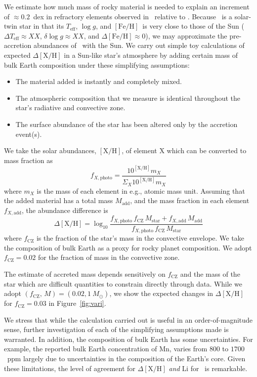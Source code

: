\documentclass[12pt,letterpaper,margin=1in]{article}
\newcommand*\elem[1]{\ensuremath{\mathrm{#1}}}
\newcommand*\elemH[1]{\ensuremath{[\mathrm{#1}/\elem{H}]}}
\newcommand*\logg{\ensuremath{\log{g}}}
\newcommand*{\feh}{\ensuremath{\elemH{Fe}}}
\newcommand{\sunanalog}{\text{Krios}}
\newcommand{\bizarreone}{\text{Kronos}}
\begin{document}
We estimate how much mass of rocky material is needed to explain an increment
of $\approx 0.2$~dex in refractory elements observed in \bizarreone\ relative
to \sunanalog\cite{Mack:2014aa,Mack:2016aa}.
Because \sunanalog\ is a solar-twin star in that its $T_\mathrm{eff}$, \logg,
and \feh\ is very close to those of the Sun ($\Delta T_\mathrm{eff} \approx XX$,
$\delta\logg \approx XX$, and $\Delta\feh \approx 0$),
we may approximate the pre-accretion abundances of \bizarreone\ with the Sun.
We carry out simple toy calculations of expected $\Delta\elemH{X}$
in a Sun-like star's atmosphere by adding certain mass of bulk Earth composition
under these simplifying assumptions:
\begin{itemize}
  \item The material added is instantly and completely mixed.
  \item The atmospheric composition that we measure is identical throughout
    the star's radiative and convective zone.
  \item The surface abundance of the star has been altered only by the
    accretion event(s).
\end{itemize}
We take the solar abundances\cite{Asplund:2009aa}, $\elemH{X}$, of element \elem{X}
which can be converted to mass fraction as
\begin{equation}
  f_{X,\mathrm{photo}} = \frac{10^{\elemH{X}} m_X}{\Sigma_X 10^{\elemH{X}} m_X}
\end{equation}
where $m_X$ is the mass of each element in e.g., atomic mass unit.
Assuming that the added material has a total mass $M_\mathrm{add}$, and the
mass fraction in each element $f_{X,\mathrm{add}}$,
the abundance difference is
\begin{equation}
  \Delta\elemH{X} = \log_{10} \frac{f_{X,\mathrm{photo}}\,f_\mathrm{CZ}\,M_\mathrm{star}
    + f_{X,\mathrm{add}}\,M_\mathrm{add}}
    {f_{X,\mathrm{photo}}\,f_\mathrm{CZ}\,M_\mathrm{star}}
\end{equation}
where $f_\mathrm{CZ}$ is the fraction of the star's mass in the convective envelope.
We take the composition of bulk Earth\cite{mcdonough2001composition}
as a proxy for rocky planet composition. We adopt $f_\mathrm{CZ} = 0.02$ for
the fraction of mass in the convective zone\cite{Pinsonneault:2001aa}.

The estimate of accreted mass depends sensitively on $f_\mathrm{CZ}$ and the
mass of the star which are difficult quantities to constrain directly through
data.
While we adopt $(f_\mathrm{CZ},\,M) = (0.02, 1~M_\odot)$, we show the
expected changes in $\Delta\elemH{X}$ for $f_\mathrm{CZ}=0.03$ in
Figure~\ref{fig:vari}.

We stress that while the calculation carried out is useful in
an order-of-magnitude sense, further investigation of each of the simplifying
assumptions made is warranted.
In addition, the composition of bulk Earth has some uncertainties.
For example, the reported bulk Earth concentration of \elem{Mn}, varies from
$800$ to $1700$~ppm\cite{1998psc..book.....L,mcdonough2001composition,2003TrGeo...2..547M}
largely due to uncertainties in the composition of the Earth's core.
Given these limitations, the level of agreement for $\Delta\elemH{X}$ {\it and}
\elem{Li} for \bizarreone\ is remarkable.

%
\end{document}
